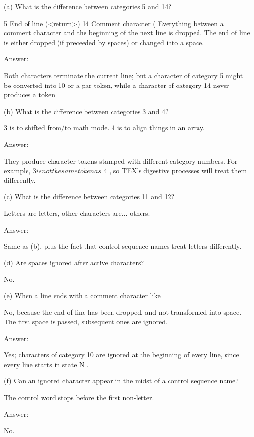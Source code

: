 (a) What is the difference between categories 5 and 14?

5 End of line (<return>)
14 Comment character (%
Everything between a comment character and the beginning of the next line is dropped.
The end of line is either dropped (if preceeded by spaces) or changed into a space.

Answer:

Both characters terminate the current line; but a character of category 5
might be converted into 10 or a par token, while a character of category 14 never
produces a token.


(b) What is the difference between categories 3 and 4? 

3 is to shifted from/to math mode.
4 is to align things in an array.

Answer:

They produce character tokens stamped with different category
numbers. For example, $ 3 is not the same token as $ 4 , so TEX’s digestive processes
will treat them differently.


(c) What is the difference between categories 11 and 12?

Letters are letters, other characters are... others.

Answer:

Same as (b), plus the fact that control sequence names
treat letters differently.


(d) Are spaces ignored after active characters?

No.


(e) When a line ends with a
comment character like %

No, because the end of line has been dropped, and not transformed into space.
The first space is passed, subsequent ones are ignored.

Answer:

Yes; characters of category 10 are ignored at the
beginning of every line, since every line starts in state N .


(f) Can
an ignored character appear in the midst of a control sequence name?

The control word stops before the first non-letter.

Answer:

No.

\bye



